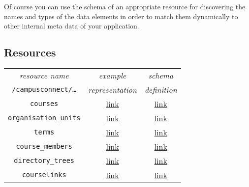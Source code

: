 Of course you can use the schema of an appropriate resource for discovering the
names and types of the data elements in order to match them dynamically to
other internal meta data of your application.

\hypertarget{campusconnect_resources}{}
\subsection{Resources}
\begin{tabular}[t]{|c|c|c|} \hline
\it resource name & \it example & \it schema\\ 
\tt /campusconnect/\ldots & \it representation & \it definition\\ \hline\hline

\tt courses
& \href{https://ecs.uni-stuttgart.de/ecsa-wiki/CampusConnect/Arbeitspakete/EcsREST/CmsCourses}{link}
& \href{http://repo.or.cz/w/ecs.git/blob_plain/HEAD:/campusconnect/schemas/cc_courses.schema.json}{link}\\ \hline

\tt organisation\_units
& \href{https://ecs.uni-stuttgart.de/ecsa-wiki/CampusConnect/Arbeitspakete/EcsREST/CmsInstitutions}{link}
& \href{http://repo.or.cz/w/ecs.git/blob_plain/HEAD:/campusconnect/schemas/cc_organisation_units.schema.json}{link}\\ \hline

\tt terms
& \href{https://ecs.uni-stuttgart.de/ecsa-wiki/CampusConnect/Arbeitspakete/EcsREST/CmsSemesters}{link}
& \href{http://repo.or.cz/w/ecs.git/blob_plain/HEAD:/campusconnect/schemas/cc_terms.schema.json}{link}\\ \hline

\tt course\_members
& \href{https://ecs.uni-stuttgart.de/ecsa-wiki/CampusConnect/Arbeitspakete/EcsREST/CmsCourseMembers}{link}
& \href{http://repo.or.cz/w/ecs.git/blob_plain/HEAD:/campusconnect/schemas/cc_course_members.schema.json}{link}\\ \hline

\tt directory\_trees
& \href{https://ecs.uni-stuttgart.de/ecsa-wiki/CampusConnect/Arbeitspakete/EcsREST/CmsDirectoryTrees}{link}
& \href{http://repo.or.cz/w/ecs.git/blob_plain/HEAD:/campusconnect/schemas/cc_directory_trees.schema.json}{link}\\ \hline

\tt courselinks
& \href{https://ecs.uni-stuttgart.de/ecsa-wiki/CampusConnect/Arbeitspakete/EcsREST/CmsCourselinks}{link}
& \href{http://repo.or.cz/w/ecs.git/blob_plain/HEAD:/campusconnect/schemas/cc_courslinks.schema.json}{link}\\ \hline

\end{tabular}

